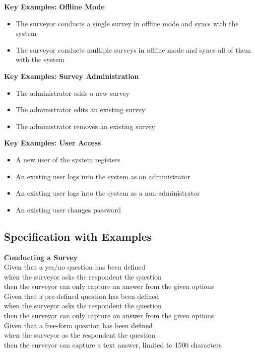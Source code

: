 \documentclass[12pt]{witseiepaper}
\begin{document}
\textbf{Key Examples: Offline Mode}
\begin{itemize}
\item The surveyor conducts a single survey in offline mode and syncs with the system
\item The surveyor conducts multiple surveys in offline mode and syncs all of them with the system
\end{itemize}

\textbf{Key Examples: Survey Administration}
\begin{itemize}
\item The administrator adds a new survey
\item The administrator edits an existing survey
\item The administrator removes an existing survey
\end{itemize}

\textbf{Key Examples: User Access}
\begin{itemize}
\item A new user of the system registers
\item An existing user logs into the system as an administrator
\item An existing user logs into the system as a non-administrator
\item An existing user changes password
\end{itemize}


\subsection{Specification with Examples}

\textbf{Conducting a Survey}\\
Given that a yes/no question has been defined \\
when the surveyor asks the respondent the question\\
then the surveyor can only capture an answer from the given options\\

Given that a pre-defined question has been defined\\
when the surveyor asks the respondent the question\\
then the surveyor can only capture an answer from the given options\\

Given that a free-form question has been defined\\
when the surveyor as the respondent the question\\
then the surveyor can capture a text answer, limited to 1500 characters\\
\end{document}
